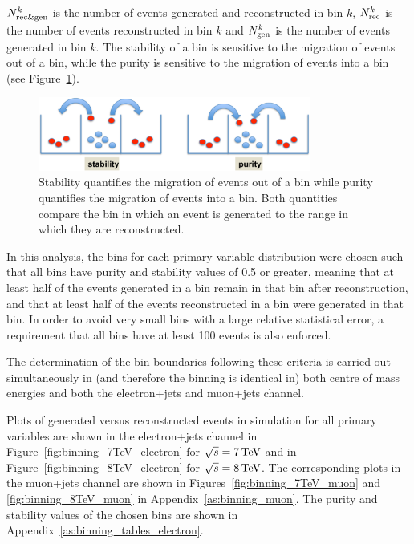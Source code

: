 $N_{\mathrm{rec}\&\mathrm{gen}}^k$ is the number of events generated and reconstructed in bin $k$,
$N_{\mathrm{rec}}^k$ is the number of events reconstructed in bin $k$ and $N_{\mathrm{gen}}^k$ is the number of events
generated in bin $k$. The stability of a bin is sensitive to the migration of events out of a bin, while
the purity is sensitive to the migration of events into a bin (see Figure~\ref{fig:purity_and_stability}).

\begin{figure}[hbtp]
	\centering
     \includegraphics[width=0.8\textwidth]{Chapters/04_Analysis/04b_XSections/images/purity_and_stability.pdf}
     \caption[Graphical representation of bin purity and stability.]{Stability quantifies the migration of
     events out of a bin while purity quantifies the migration of events into a bin. Both quantities compare
     the bin in which an event is generated to the range in which they are reconstructed.}
     \label{fig:purity_and_stability}
 \end{figure}

In this analysis, the bins for each primary variable distribution were chosen such that all bins have purity
and stability values of 0.5 or greater, meaning that at least half of the events generated in a bin remain in
that bin after reconstruction, and that at least half of the events reconstructed in a bin were generated in
that bin. In order to avoid very small bins with a large relative statistical error, a requirement that all
bins have at least 100 events is also enforced.

The determination of the bin boundaries following these criteria is carried out simultaneously in (and
therefore the binning is identical in) both centre of mass energies and both the electron+jets and
muon+jets channel.

Plots of generated versus reconstructed events in simulation for all primary variables are shown in the
electron+jets channel in Figure~\ref{fig:binning_7TeV_electron} for $\sqrt{s}=7\,\text{Te\hspace{-.08em}V}$ and in
Figure~\ref{fig:binning_8TeV_electron} for $\sqrt{s}=8\,\text{Te\hspace{-.08em}V}$. The corresponding plots in the muon+jets channel
are shown in Figures~\ref{fig:binning_7TeV_muon} and \ref{fig:binning_8TeV_muon} in
Appendix~\ref{as:binning_muon}. The purity and stability values of the chosen bins are shown in
Appendix~\ref{as:binning_tables_electron}.

